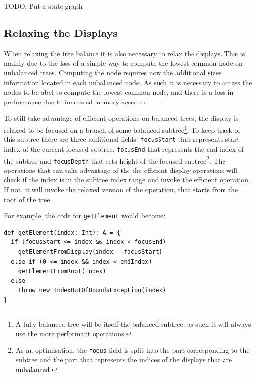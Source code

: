 \color{red} TODO: Put a state graph \color{black}



\subsection{Relaxing the Displays}
When relaxing the tree balance it is also necessary to relax the displays. This is mainly due to the loss of a simple way to compute the lowest common node on unbalanced trees. Computing the node requires now the additional sizes information located in each unbalanced node. As such it is necessary to access the nodes to be abel to compute the lowest common node, and there is a loss in performance due to increased memory accesses. 

To still take advantage of efficient operations on balanced trees, the display is relaxed to be focused on a branch of some balanced subtree\footnote{A fully balanced tree will be itself the balanced subtree, as such it will always use the more performant operations.}. To keep track of this subtree there are three additional fields: \texttt{focusStart} that represents start index of the current focused subtree, \texttt{focusEnd} that represents the end index of the subtree and \texttt{focusDepth} that sets  height of the focused subtree\footnote{As an optimisation, the \texttt{focus} field is split into the part corresponding to the subtree and the part that represents the indices of the displays that are unbalanced.}. The operations that can take advantage of the the efficient display operations will check if the index is in the subtree index range and invoke the efficient operation. If not, it will invoke the relaxed version of the operation, that starts from the root of the tree.

For example, the code for \texttt{getElement} would become:
\begin{lstlisting}[frame=single]
def getElement(index: Int): A = {
  if (focusStart <= index && index < focusEnd) 
    getElementFromDisplay(index - focusStart)
  else if (0 <= index && index < endIndex) 
    getElementFromRoot(index)    
  else 
    throw new IndexOutOfBoundsException(index)
}
\end{lstlisting}


